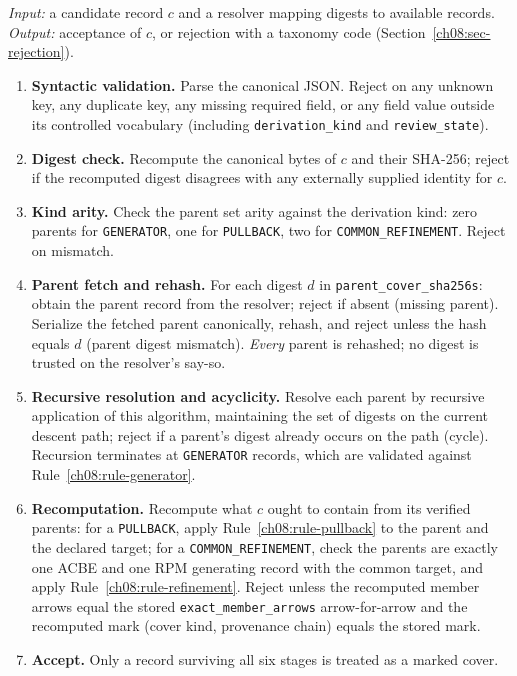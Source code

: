 \begin{algorithm}\label{ch08:alg-resolution}
\emph{Input:} a candidate record $c$ and a resolver mapping digests to available records. \emph{Output:} acceptance of $c$, or rejection with a taxonomy code (Section~\ref{ch08:sec-rejection}).
\begin{enumerate}
\item \textbf{Syntactic validation.} Parse the canonical JSON. Reject on any unknown key, any duplicate key, any missing required field, or any field value outside its controlled vocabulary (including \texttt{derivation\_kind} and \texttt{review\_state}).
\item \textbf{Digest check.} Recompute the canonical bytes of $c$ and their SHA-256; reject if the recomputed digest disagrees with any externally supplied identity for $c$.
\item \textbf{Kind arity.} Check the parent set arity against the derivation kind: zero parents for \texttt{GENERATOR}, one for \texttt{PULLBACK}, two for \texttt{COMMON\_REFINEMENT}. Reject on mismatch.
\item \textbf{Parent fetch and rehash.} For each digest $d$ in \texttt{parent\_cover\_sha256s}: obtain the parent record from the resolver; reject if absent (missing parent). Serialize the fetched parent canonically, rehash, and reject unless the hash equals $d$ (parent digest mismatch). \emph{Every} parent is rehashed; no digest is trusted on the resolver's say-so.
\item \textbf{Recursive resolution and acyclicity.} Resolve each parent by recursive application of this algorithm, maintaining the set of digests on the current descent path; reject if a parent's digest already occurs on the path (cycle). Recursion terminates at \texttt{GENERATOR} records, which are validated against Rule~\ref{ch08:rule-generator}.
\item \textbf{Recomputation.} Recompute what $c$ ought to contain from its verified parents: for a \texttt{PULLBACK}, apply Rule~\ref{ch08:rule-pullback} to the parent and the declared target; for a \texttt{COMMON\_REFINEMENT}, check the parents are exactly one ACBE and one RPM generating record with the common target, and apply Rule~\ref{ch08:rule-refinement}. Reject unless the recomputed member arrows equal the stored \texttt{exact\_member\_arrows} arrow-for-arrow and the recomputed mark (cover kind, provenance chain) equals the stored mark.
\item \textbf{Accept.} Only a record surviving all six stages is treated as a marked cover.
\end{enumerate}
\end{algorithm}

